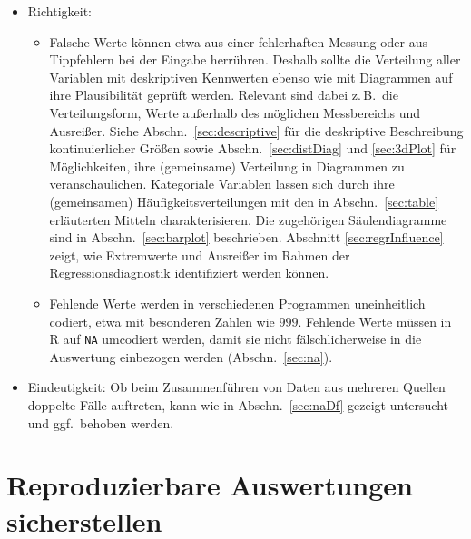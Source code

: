 \begin{itemize}
\item Richtigkeit:
\begin{itemize}
\item Falsche Werte können etwa aus einer fehlerhaften Messung oder aus Tippfehlern bei der Eingabe herrühren. Deshalb sollte die Verteilung aller Variablen mit deskriptiven Kennwerten ebenso wie mit Diagrammen auf ihre Plausibilität geprüft werden. Relevant sind dabei z.\,B.\ die Verteilungsform, Werte außerhalb des möglichen Messbereichs und Ausreißer. Siehe Abschn.\ \ref{sec:descriptive} für die deskriptive Beschreibung kontinuierlicher Größen sowie Abschn.\ \ref{sec:distDiag} und \ref{sec:3dPlot} für Möglichkeiten, ihre (gemeinsame) Verteilung in Diagrammen zu veranschaulichen. Kategoriale Variablen lassen sich durch ihre (gemeinsamen) Häufigkeitsverteilungen mit den in Abschn.\ \ref{sec:table} erläuterten Mitteln charakterisieren. Die zugehörigen Säulendiagramme sind in Abschn.\ \ref{sec:barplot} beschrieben. Abschnitt \ref{sec:regrInfluence} zeigt, wie Extremwerte und Ausreißer im Rahmen der Regressionsdiagnostik identifiziert werden können.
\item Fehlende Werte werden in verschiedenen Programmen uneinheitlich codiert, etwa mit besonderen Zahlen wie $999$. Fehlende Werte müssen in R auf \lstinline!NA! umcodiert werden, damit sie nicht fälschlicherweise in die Auswertung einbezogen werden (Abschn.\ \ref{sec:na}).
\end{itemize}
\item Eindeutigkeit: Ob beim Zusammenführen von Daten aus mehreren Quellen doppelte Fälle auftreten, kann wie in Abschn.\ \ref{sec:naDf} gezeigt untersucht und ggf.\ behoben werden.
\end{itemize}

\section{Reproduzierbare Auswertungen sicherstellen}
\label{sec:reproducibility}

